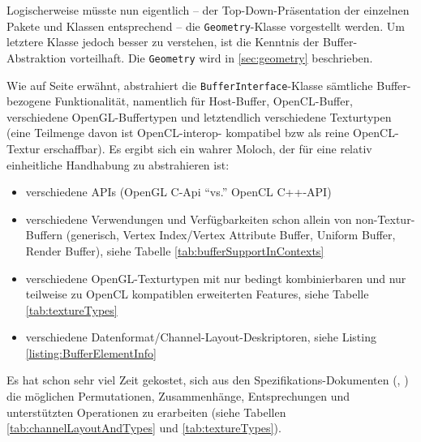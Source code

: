 \label{sec:architecture:BufferAbstraction} 	

	Logischerweise müsste nun eigentlich 
	-- der Top-Down-Präsentation der einzelnen Pakete und Klassen entsprechend --
	die \lstinline|Geometry|-Klasse vorgestellt werden. Um letztere Klasse jedoch besser zu verstehen,
	ist die Kenntnis der Buffer-Abstraktion vorteilhaft. Die \lstinline|Geometry| wird in \ref{sec:geometry} beschrieben.
	
	Wie auf Seite \pageref{overview:bufferAbstraction} erwähnt, abstrahiert die \lstinline|BufferInterface|-Klasse
	sämtliche Buffer-bezogene Funktionalität, namentlich für Host-Buffer, OpenCL-Buffer, 
	verschiedene OpenGL-Buffertypen und letztendlich verschiedene Texturtypen (eine Teilmenge davon ist OpenCL-interop-
	kompatibel bzw als reine OpenCL-Textur erschaffbar).
	Es ergibt sich ein wahrer Moloch, der für eine relativ einheitliche Handhabung zu abstrahieren ist: 
	
	\begin{itemize}
		\item verschiedene APIs (OpenGL C-Api "`vs."' OpenCL C++-API)
		\item verschiedene Verwendungen und Verfügbarkeiten schon allein von non-Textur-Buffern 
			(generisch, Vertex Index/Vertex Attribute Buffer, Uniform Buffer, Render Buffer),
			siehe Tabelle \ref{tab:bufferSupportInContexts}
		\item verschiedene OpenGL-Texturtypen mit nur bedingt kombinierbaren und nur teilweise zu OpenCL kompatiblen 
			erweiterten  Features, siehe Tabelle \ref{tab:textureTypes} 
		\item verschiedene Datenformat/Channel-Layout-Deskriptoren, siehe Listing \ref{listing:BufferElementInfo}
	\end{itemize}	
	
	Es hat schon sehr viel Zeit gekostet, sich aus den Spezifikations-Dokumenten 
	(\cite{openGL_4_1_Spec}, \cite{openCL_1_0_Spec}) die möglichen Permutationen, Zusammenhänge, Entsprechungen
	und unterstützten Operationen zu erarbeiten 
	(siehe Tabellen \ref{tab:channelLayoutAndTypes} und \ref{tab:textureTypes}).
	
